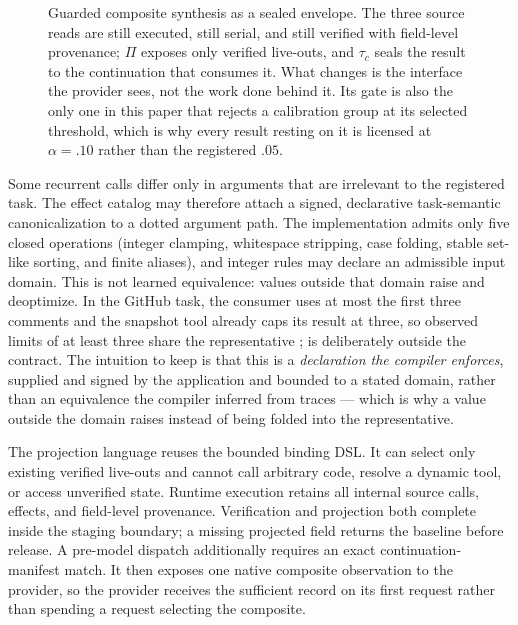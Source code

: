 \begin{figure}[t]
  \centering
  
  \caption{Guarded composite synthesis as a sealed envelope.  The three source reads are
  still executed, still serial, and still verified with field-level provenance; $\Pi$
  exposes only verified live-outs, and $\tau_c$ seals the result to the continuation that
  consumes it.  What changes is the interface the provider sees, not the work done behind
  it.  Its gate is also the only one in this paper that rejects a calibration group at
  its selected threshold, which is why every result resting on it is licensed at
  $\alpha=.10$ rather than the registered $.05$.}
  \label{fig:gcs-envelope}
\end{figure}

Some recurrent calls differ only in arguments that are irrelevant to the registered task.
The effect catalog may therefore attach a signed, declarative task-semantic
canonicalization to a dotted argument path.  The implementation admits only five closed
operations (integer clamping, whitespace stripping, case folding, stable set-like sorting,
and finite aliases), and integer rules may declare an admissible input domain.  This is not
learned equivalence: values outside that domain raise and deoptimize.  In the GitHub task,
the consumer uses at most the first three comments and the snapshot tool already caps its
result at three, so observed limits of at least three share the representative
;  is deliberately outside the contract.  The intuition to
keep is that this is a \emph{declaration the compiler enforces}, supplied and signed by
the application and bounded to a stated domain, rather than an equivalence the compiler
inferred from traces --- which is why a value outside the domain raises instead of being
folded into the representative.

The projection language reuses the bounded binding DSL.  It can select only existing
verified live-outs and cannot call arbitrary code, resolve a dynamic tool, or access
unverified state.  Runtime execution retains all internal source calls, effects, and
field-level provenance.  Verification and projection both complete inside the staging
boundary; a missing projected field returns the baseline before release.  A pre-model
dispatch additionally requires an exact continuation-manifest match.  It then exposes one
native composite observation to the provider, so the provider receives the sufficient
record on its first request rather than spending a request selecting the composite.

